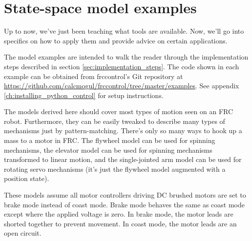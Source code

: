 
\chapter{State-space model examples}

Up to now, we've just been teaching what tools are available. Now, we'll go into
specifics on how to apply them and provide advice on certain applications.

The \gls{model} examples are intended to walk the reader through the
implementation steps described in section \ref{sec:implementation_steps}. The
code shown in each example can be obtained from frccontrol's Git repository at
\url{https://github.com/calcmogul/frccontrol/tree/master/examples}. See appendix
\ref{ch:installing_python_control} for setup instructions.

The \glspl{model} derived here should cover most types of motion seen on an FRC
robot. Furthermore, they can be easily tweaked to describe many types of
mechanisms just by pattern-matching. There's only so many ways to hook up a mass
to a motor in FRC. The flywheel \gls{model} can be used for spinning mechanisms,
the elevator \gls{model} can be used for spinning mechanisms transformed to
linear motion, and the single-jointed arm \gls{model} can be used for rotating
servo mechanisms (it's just the flywheel \gls{model} augmented with a position
\gls{state}).

These \glspl{model} assume all motor controllers driving DC brushed motors are
set to brake mode instead of coast mode. Brake mode behaves the same as coast
mode except where the applied voltage is zero. In brake mode, the motor leads
are shorted together to prevent movement. In coast mode, the motor leads are an
open circuit.

\renewcommand*{\chapterpath}{\partpath/ss-model-examples}







